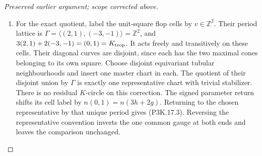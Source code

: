 \begin{proof}[Preserved earlier argument; scope corrected above]
\begin{enumerate}[label=\arabic*.]
\item For the exact quotient, label the unit-square flop cells by
\(v\in\mathbb Z^2\).  Their period lattice is
\(\Gamma=\langle(2,1),(-3,-1)\rangle=\mathbb Z^2\),
and \(3(2,1)+2(-3,-1)=(0,1)=K_{\rm trop}\).
It acts freely and transitively on these cells.  Their diagonal
curves are disjoint, since each has the two maximal cones
belonging to its own square.  Choose disjoint equivariant
tubular neighbourhoods and insert one master chart in each.
The quotient of their disjoint union by \(\Gamma\) is
exactly one representative chart with trivial stabilizer.
There is no residual \(K\)-circle on this correction.
The signed parameter return shifts its cell label by
\(n(0,1)=n(3h+2g)\).  Returning to the chosen representative
by that unique period gives (P3K.17.3).  Reversing the
representative convention inverts the one common gauge at
both ends and leaves the comparison unchanged.


\end{enumerate}
\end{proof}
